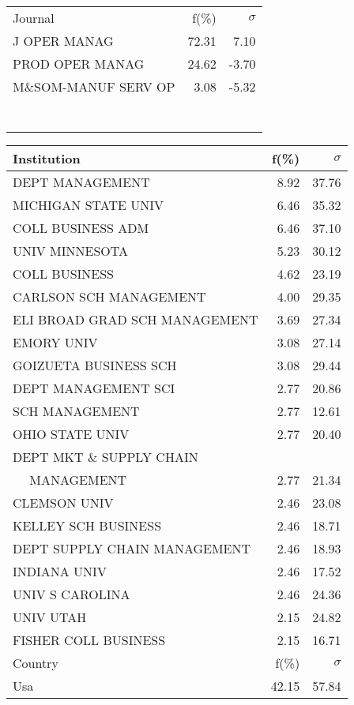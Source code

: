 \documentclass[a4paper,11pt]{report}
\begin{document}
\begin{landscape}
\begin{table}[!ht]
{\begin{tabular}{|l r  r|}
 &  & \\
\hline
\hline
Journal & f(\%) & $\sigma$\\
\hline
J OPER MANAG & 72.31 & 7.10\\
PROD OPER MANAG & 24.62 & -3.70\\
M\&SOM-MANUF SERV OP & 3.08 & -5.32\\
 &  & \\
 &  & \\
 &  & \\
 &  & \\
 &  & \\
 &  & \\
 &  & \\
\hline
\end{tabular}
}
{\scriptsize\begin{tabular}{|l r r|}
\hline
Institution & f(\%) & $\sigma$\\
\hline
DEPT MANAGEMENT & 8.92 & 37.76\\
MICHIGAN STATE UNIV & 6.46 & 35.32\\
COLL BUSINESS ADM & 6.46 & 37.10\\
UNIV MINNESOTA & 5.23 & 30.12\\
COLL BUSINESS & 4.62 & 23.19\\
CARLSON SCH MANAGEMENT & 4.00 & 29.35\\
ELI BROAD GRAD SCH MANAGEMENT & 3.69 & 27.34\\
EMORY UNIV & 3.08 & 27.14\\
GOIZUETA BUSINESS SCH & 3.08 & 29.44\\
DEPT MANAGEMENT SCI & 2.77 & 20.86\\
SCH MANAGEMENT & 2.77 & 12.61\\
OHIO STATE UNIV & 2.77 & 20.40\\
DEPT MKT \& SUPPLY CHAIN &  & \\
$\quad$ MANAGEMENT & 2.77 & 21.34\\
CLEMSON UNIV & 2.46 & 23.08\\
KELLEY SCH BUSINESS & 2.46 & 18.71\\
DEPT SUPPLY CHAIN MANAGEMENT & 2.46 & 18.93\\
INDIANA UNIV & 2.46 & 17.52\\
UNIV S CAROLINA & 2.46 & 24.36\\
UNIV UTAH & 2.15 & 24.82\\
FISHER COLL BUSINESS & 2.15 & 16.71\\
\hline
\hline
Country & f(\%) & $\sigma$\\
\hline
Usa & 42.15 & 57.84\\

\end{tabular}}
\end{table}
\end{landscape}
\end{document}
